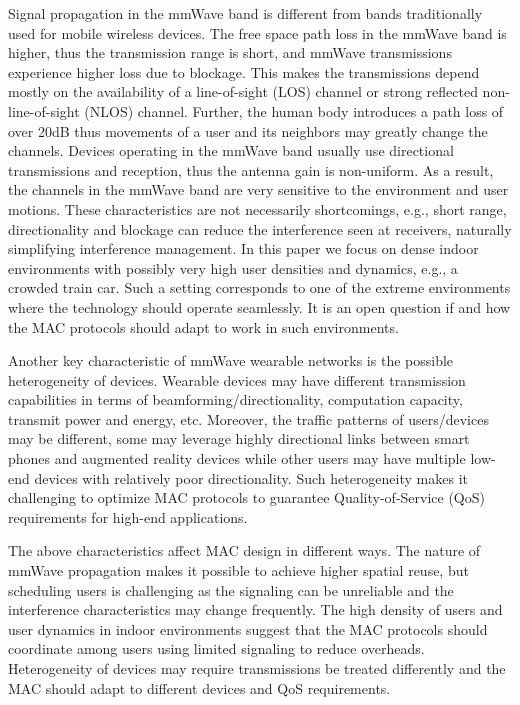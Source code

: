 \documentclass[10pt, conference, letterpaper]{IEEEtran}
\begin{document}


Signal propagation in the mmWave band is different from bands traditionally used for mobile wireless devices. 
The free space path loss in the mmWave band is higher, thus the transmission range is short, and mmWave transmissions experience higher loss due to blockage. 
This makes the transmissions depend mostly on the availability of a line-of-sight (LOS) channel or strong reflected non-line-of-sight (NLOS) channel.
Further, the human body introduces a path loss of over 20dB \cite{humanshadowing} thus movements of a user and its neighbors may greatly change the channels.
Devices operating in the mmWave band usually use directional transmissions and reception, thus the antenna gain is non-uniform. 
As a result, the channels in the mmWave band are very sensitive to the environment and user motions. 
These characteristics are not necessarily shortcomings, e.g., short range, directionality and blockage can reduce the interference seen at receivers, naturally simplifying interference management. 
In this paper we focus on dense indoor environments with possibly very high user densities and dynamics, e.g., a crowded train car.
Such a setting corresponds to one of the extreme environments where the technology should operate seamlessly. 
It is an open question if and how the MAC protocols should adapt to work in such environments.%


Another key characteristic of mmWave wearable networks is the possible heterogeneity of devices. 
Wearable devices may have different transmission capabilities in terms of beamforming/directionality, computation capacity, transmit power and energy, etc. 
Moreover, the traffic patterns of users/devices may be different, some may leverage highly directional links between smart phones and augmented reality devices while other users may have multiple low-end devices with relatively poor directionality.
Such heterogeneity makes it challenging to optimize MAC protocols to guarantee Quality-of-Service (QoS) requirements for high-end applications.


The above characteristics affect MAC design in different ways. 
The nature of mmWave propagation makes it possible to achieve higher spatial reuse, but scheduling users is challenging as the signaling can be unreliable and the interference characteristics may change frequently.
The high density of users and user dynamics in indoor environments suggest that the MAC protocols should coordinate among users using limited signaling to reduce overheads. 
Heterogeneity of devices may require transmissions be treated differently and the MAC should adapt to different devices and QoS requirements.
\end{document}
